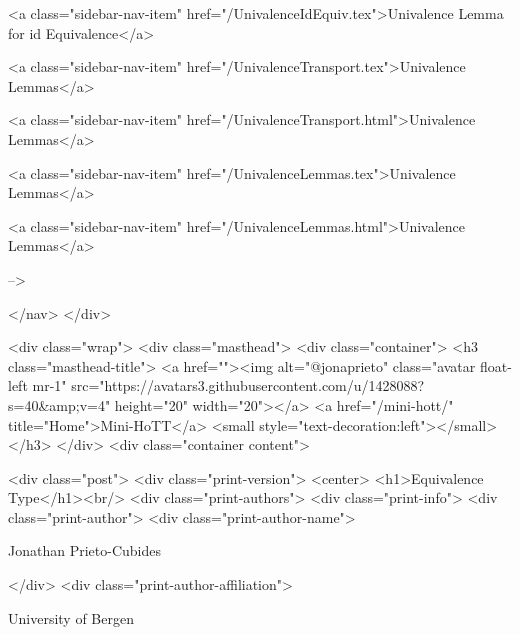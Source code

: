       
        
          <a class="sidebar-nav-item" href="/UnivalenceIdEquiv.tex">Univalence Lemma for id Equivalence</a>
        
      
    
      
        
          <a class="sidebar-nav-item" href="/UnivalenceTransport.tex">Univalence Lemmas</a>
        
      
    
      
        
          <a class="sidebar-nav-item" href="/UnivalenceTransport.html">Univalence Lemmas</a>
        
      
    
      
        
          <a class="sidebar-nav-item" href="/UnivalenceLemmas.tex">Univalence Lemmas</a>
        
      
    
      
        
          <a class="sidebar-nav-item" href="/UnivalenceLemmas.html">Univalence Lemmas</a>
        
      
     -->

  </nav>
</div>

    <div class="wrap">
      <div class="masthead">
        <div class="container">
          <h3 class="masthead-title">
            <a href=""><img alt="@jonaprieto" class="avatar float-left mr-1" src="https://avatars3.githubusercontent.com/u/1428088?s=40&amp;v=4" height="20" width="20"></a>
            <a href="/mini-hott/" title="Home">Mini-HoTT</a>
            <small style="text-decoration:left"></small>
          </h3>
        </div>
      <div class="container content">
        







<div class="post">
  <div class="print-version">
    <center>
      <h1>Equivalence Type</h1><br/>
        <div class="print-authors">
          <div class="print-info">
            <div class="print-author">
              <div class="print-author-name">
                
                  Jonathan Prieto-Cubides
                
              </div>
              <div class="print-author-affiliation">
                
                  University of Bergen
                
